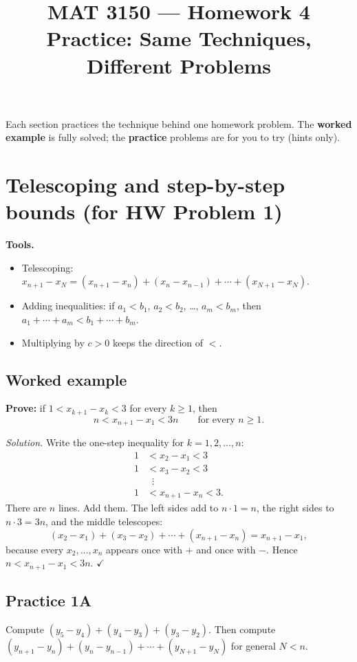 \documentclass[11pt]{article}
\title{MAT 3150 --- Homework 4\\
\large Practice: Same Techniques, Different Problems}
\author{}
\date{}
\begin{document}
\maketitle

Each section practices the technique behind one homework problem.
The \textbf{worked example} is fully solved; the \textbf{practice} problems
are for you to try (hints only).

\section{Telescoping and step-by-step bounds \quad (for HW Problem 1)}

\textbf{Tools.}
\begin{itemize}
  \item Telescoping: $x_{n+1}-x_N = (x_{n+1}-x_n)+(x_n-x_{n-1})+\cdots+(x_{N+1}-x_N)$.
  \item Adding inequalities: if $a_1<b_1$, $a_2<b_2$, \dots, $a_m<b_m$, then
        $a_1+\cdots+a_m < b_1+\cdots+b_m$.
  \item Multiplying by $c>0$ keeps the direction of $<$.
\end{itemize}

\subsection*{Worked example}
\textbf{Prove:} if $1 < x_{k+1}-x_k < 3$ for every $k\ge 1$, then
\[
  n < x_{n+1}-x_1 < 3n \qquad\text{for every } n\ge 1 .
\]

\emph{Solution.} Write the one-step inequality for $k=1,2,\dots,n$:
\[
\begin{aligned}
  1 &< x_2 - x_1 < 3\\
  1 &< x_3 - x_2 < 3\\
    &\;\;\vdots\\
  1 &< x_{n+1} - x_n < 3 .
\end{aligned}
\]
There are $n$ lines. Add them. The left sides add to $n\cdot 1 = n$, the right
sides to $n\cdot 3 = 3n$, and the middle telescopes:
\[
  (x_2-x_1)+(x_3-x_2)+\cdots+(x_{n+1}-x_n) = x_{n+1}-x_1 ,
\]
because every $x_2,\dots,x_n$ appears once with $+$ and once with $-$.
Hence $n < x_{n+1}-x_1 < 3n$. \hfill$\checkmark$

\subsection*{Practice 1A}
Compute $(y_5-y_4)+(y_4-y_3)+(y_3-y_2)$. Then compute
$(y_{n+1}-y_n)+(y_n-y_{n-1})+\cdots+(y_{N+1}-y_N)$ for general $N<n$.
\end{document}

